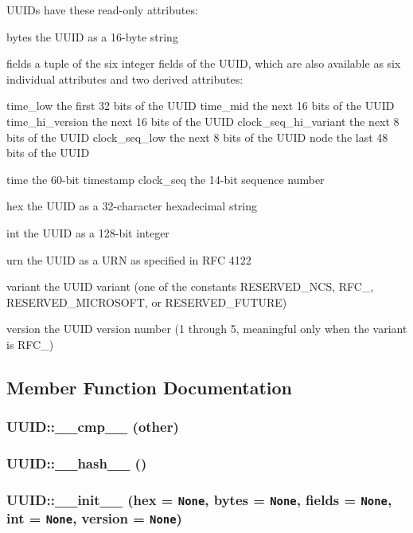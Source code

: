 UUIDs have these read-only attributes:

bytes the UUID as a 16-byte string

fields a tuple of the six integer fields of the UUID, which are also available as six individual attributes and two derived attributes:

time\_\-low the first 32 bits of the UUID time\_\-mid the next 16 bits of the UUID time\_\-hi\_\-version the next 16 bits of the UUID clock\_\-seq\_\-hi\_\-variant the next 8 bits of the UUID clock\_\-seq\_\-low the next 8 bits of the UUID node the last 48 bits of the UUID

time the 60-bit timestamp clock\_\-seq the 14-bit sequence number

hex the UUID as a 32-character hexadecimal string

int the UUID as a 128-bit integer

urn the UUID as a URN as specified in RFC 4122

variant the UUID variant (one of the constants RESERVED\_\-NCS, RFC\_, RESERVED\_\-MICROSOFT, or RESERVED\_\-FUTURE)

version the UUID version number (1 through 5, meaningful only when the variant is RFC\_)



\subsection{Member Function Documentation}
\subsubsection{\setlength{\rightskip}{0pt plus 5cm}UUID::\_\-\_\-cmp\_\-\_\- (other)}\label{classUUID_UUIDa1}


\subsubsection{\setlength{\rightskip}{0pt plus 5cm}UUID::\_\-\_\-hash\_\-\_\- ()}\label{classUUID_UUIDa2}


\subsubsection{\setlength{\rightskip}{0pt plus 5cm}UUID::\_\-\_\-init\_\-\_\- (hex = {\tt None}, bytes = {\tt None}, fields = {\tt None}, int = {\tt None}, version = {\tt None})}\label{classUUID_UUIDa0}


